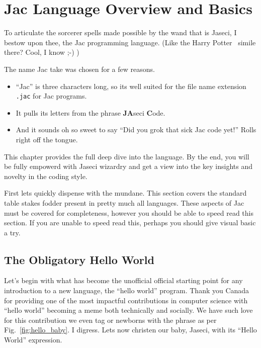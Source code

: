 \chapter{Jac Language Overview and Basics}
\minitoc
To articulate the sorcerer spells made possible by the wand that is Jaseci, I bestow upon thee, the Jac programming language. (Like the Harry Potter~\cite{harrypotter} simile there? Cool, I know ;-) )
\par
The name Jac take was chosen for a few reasons.
\begin{itemize}
    \item ``Jac'' is three characters long, so its well suited for the file name extension \texttt{.jac} for Jac programs.
    \item It pulls its letters from the phrase \textbf{JA}seci \textbf{C}ode.
    \item And it sounds oh so sweet to say ``Did you \gls{grok} that \gls{sick} Jac code yet!'' Rolls right off the tongue.
\end{itemize}
\par
This chapter provides the full deep dive into the language. By the end, you will be fully empowerd with Jaseci wizardry and get a view into the key insights and novelty in the coding style.

First lets quickly dispense with the mundane. This section covers the standard table stakes fodder present in pretty much all languages. These aspects of Jac must be covered for completeness, however you should be able to speed read this section.  If you are unable to speed read this, perhaps you should give visual basic a try.

\section{The Obligatory Hello World}
\printfigHelloWorldBaby
Let's begin with what has become the unofficial official starting point for any introduction to a new language, the ``hello world'' program. Thank you Canada for providing one of the most impactful contributions in computer science with ``hello world'' becoming a meme both technically and socially. We have such love for this contribution we even tag or newborns with the phrase as per Fig.~\ref{fig:hello_baby}. I digress. Lets now \gls{christen} our baby, Jaseci, with its ``Hello World'' expression.

